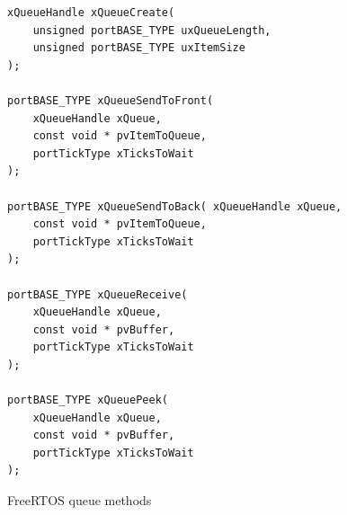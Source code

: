 \begin{listing}[H]
\begin{verbatim}
xQueueHandle xQueueCreate( 
	unsigned portBASE_TYPE uxQueueLength, 
	unsigned portBASE_TYPE uxItemSize 
); 

portBASE_TYPE xQueueSendToFront( 
	xQueueHandle xQueue, 
	const void * pvItemToQueue, 
	portTickType xTicksToWait 
);

portBASE_TYPE xQueueSendToBack( xQueueHandle xQueue, 
	const void * pvItemToQueue, 
	portTickType xTicksToWait 
); 

portBASE_TYPE xQueueReceive( 
	xQueueHandle xQueue,
	const void * pvBuffer, 
	portTickType xTicksToWait 
);

portBASE_TYPE xQueuePeek( 
	xQueueHandle xQueue,
	const void * pvBuffer, 
	portTickType xTicksToWait 
);
\end{verbatim}
\caption{FreeRTOS queue methods}
\label{lst:freertos_queue_methods}
\end{listing} 

